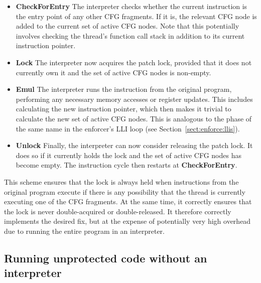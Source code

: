 \begin{itemize}
\item \textbf{CheckForEntry} The interpreter checks whether the
  current instruction is the entry point of any other CFG fragments.
  If it is, the relevant CFG node is added to the current set of
  active CFG nodes.  Note that this potentially involves checking the
  thread's function call stack in addition to its current instruction
  pointer.  

\item \textbf{Lock} The interpreter now acquires the patch lock,
  provided that it does not currently own it and the set of active CFG
  nodes is non-empty.

\item \textbf{Emul} The interpreter runs the instruction from the
  original program, performing any necessary memory accesses or
  register updates.  This includes calculating the new instruction
  pointer, which then makes it trivial to calculate the new set of
  active CFG nodes.  This is analogous to the phase of the same name
  in the enforcer's LLI loop (see Section~\ref{sect:enforce:llis}).

\item \textbf{Unlock} Finally, the interpreter can now consider
  releasing the patch lock.  It does so if it currently holds the lock
  and the set of active CFG nodes has become empty.  The instruction
  cycle then restarts at \textbf{CheckForEntry}.
\end{itemize}

This scheme ensures that the lock is always held when instructions
from the original program execute if there is any possibility that the
thread is currently executing one of the CFG fragments.  At the same
time, it correctly ensures that the lock is never double-acquired or
double-released.  It therefore correctly implements the desired fix,
but at the expense of potentially very high overhead due to running
the entire program in an interpreter.

\subsection{Running unprotected code without an interpreter}

